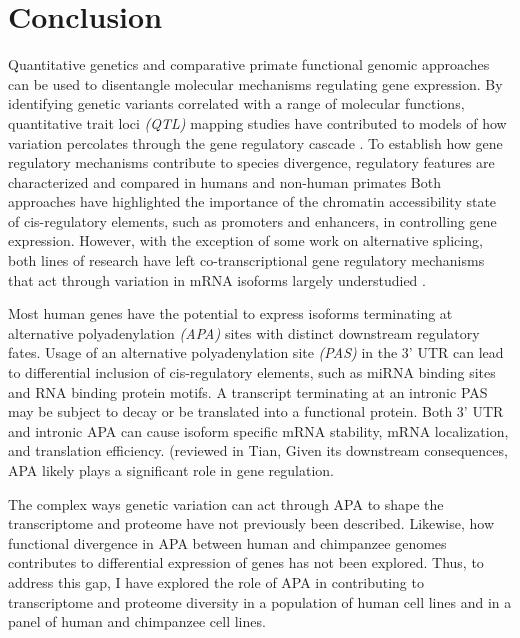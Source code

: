 \chapter{Conclusion}\label{conclusion}


Quantitative genetics and comparative primate functional genomic approaches can be used to disentangle molecular mechanisms regulating gene expression. By identifying genetic variants correlated with a range of molecular functions, quantitative trait loci \emph{(QTL)} mapping studies have contributed to models of how variation percolates through the gene regulatory cascade \citep{degner_dnase_2012, mcvicker_identification_2013, li_rna_2016, pickrell_understanding_2010}. To establish how gene regulatory mechanisms contribute to species divergence, regulatory features are characterized and compared in humans and non-human primates \citep{pai_comparative_2014, romero_widespread_2018, eres_reorganization_2019, blake_comparison_2020, khan_primate_2013, pai_genome-wide_2011, shibata_extensive_2012-1} Both approaches have highlighted the importance of the chromatin accessibility state of cis-regulatory elements, such as promoters and enhancers, in controlling gene expression. However, with the exception of some work on alternative splicing, both lines of research have left co-transcriptional gene regulatory mechanisms that act through variation in mRNA isoforms largely understudied \citep{blekhman_sex-specific_2010, li_rna_2016}. 


Most human genes have the potential to express isoforms terminating at alternative polyadenylation \emph{(APA)} sites with distinct downstream regulatory fates. Usage of an alternative polyadenylation site \emph{(PAS)} in the 3' UTR can lead to differential inclusion of cis-regulatory elements, such as miRNA binding sites and RNA binding protein motifs. A transcript terminating at an intronic PAS may be subject to decay or be translated into a functional protein. Both 3' UTR and intronic APA can cause isoform specific mRNA stability, mRNA localization, and translation efficiency. (reviewed in Tian, \citep{tian_alternative_2017} Given its downstream consequences, APA likely plays a significant role in gene regulation.

 The complex ways genetic variation can act through APA to shape the transcriptome and proteome have not previously been described. Likewise, how functional divergence in APA between human and chimpanzee genomes contributes to differential expression of genes has not been explored. Thus, to address this gap, I have explored the role of APA in contributing to transcriptome and proteome diversity in a population of human cell lines and in a panel of human and chimpanzee cell lines.
 
